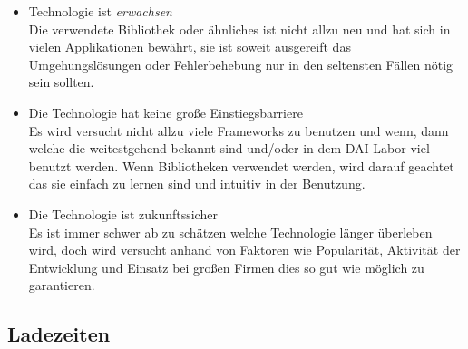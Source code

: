 \documentclass[12pt,twoside]{book}
\begin{document}
\begin{itemize}
  \item Technologie ist \textit{erwachsen} \\
  Die verwendete Bibliothek oder ähnliches ist nicht allzu neu und hat sich in vielen Applikationen bewährt, sie ist soweit ausgereift das Umgehungslösungen oder Fehlerbehebung nur in den seltensten Fällen nötig sein sollten.
  \item Die Technologie hat keine große Einstiegsbarriere \\
  Es wird versucht nicht allzu viele Frameworks zu benutzen und wenn, dann welche die weitestgehend bekannt sind und/oder in dem DAI-Labor viel benutzt werden. Wenn Bibliotheken verwendet werden, wird darauf geachtet das sie einfach zu lernen sind und intuitiv in der Benutzung.
  \item Die Technologie ist zukunftssicher \\
  Es ist immer schwer ab zu schätzen welche Technologie länger überleben wird, doch wird versucht anhand von Faktoren wie Popularität, Aktivität der Entwicklung und Einsatz bei großen Firmen dies so gut wie möglich zu garantieren.
\end{itemize}

\subsection{Ladezeiten}
\end{document}
